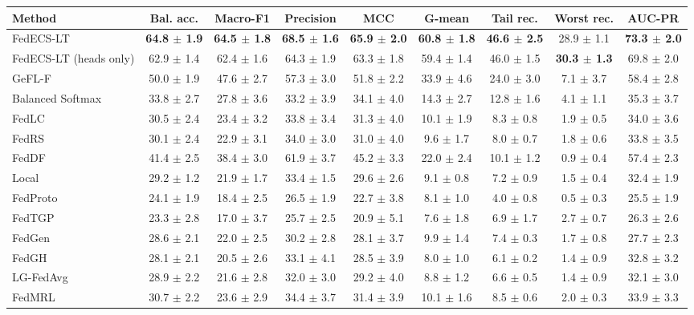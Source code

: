 \begin{tabular}{lcccccccc}
\toprule
Method & Bal. acc. & Macro-F1 & Precision & MCC & G-mean & Tail rec. & Worst rec. & AUC-PR\\
\midrule
FedECS-LT & \textbf{64.8 $\pm$ 1.9} & \textbf{64.5 $\pm$ 1.8} & \textbf{68.5 $\pm$ 1.6} & \textbf{65.9 $\pm$ 2.0} & \textbf{60.8 $\pm$ 1.8} & \textbf{46.6 $\pm$ 2.5} & 28.9 $\pm$ 1.1 & \textbf{73.3 $\pm$ 2.0}\\
FedECS-LT (heads only) & 62.9 $\pm$ 1.4 & 62.4 $\pm$ 1.6 & 64.3 $\pm$ 1.9 & 63.3 $\pm$ 1.8 & 59.4 $\pm$ 1.4 & 46.0 $\pm$ 1.5 & \textbf{30.3 $\pm$ 1.3} & 69.8 $\pm$ 2.0\\
GeFL-F & 50.0 $\pm$ 1.9 & 47.6 $\pm$ 2.7 & 57.3 $\pm$ 3.0 & 51.8 $\pm$ 2.2 & 33.9 $\pm$ 4.6 & 24.0 $\pm$ 3.0 & 7.1 $\pm$ 3.7 & 58.4 $\pm$ 2.8\\
Balanced Softmax & 33.8 $\pm$ 2.7 & 27.8 $\pm$ 3.6 & 33.2 $\pm$ 3.9 & 34.1 $\pm$ 4.0 & 14.3 $\pm$ 2.7 & 12.8 $\pm$ 1.6 & 4.1 $\pm$ 1.1 & 35.3 $\pm$ 3.7\\
FedLC & 30.5 $\pm$ 2.4 & 23.4 $\pm$ 3.2 & 33.8 $\pm$ 3.4 & 31.3 $\pm$ 4.0 & 10.1 $\pm$ 1.9 & 8.3 $\pm$ 0.8 & 1.9 $\pm$ 0.5 & 34.0 $\pm$ 3.6\\
FedRS & 30.1 $\pm$ 2.4 & 22.9 $\pm$ 3.1 & 34.0 $\pm$ 3.0 & 31.0 $\pm$ 4.0 & 9.6 $\pm$ 1.7 & 8.0 $\pm$ 0.7 & 1.8 $\pm$ 0.6 & 33.8 $\pm$ 3.5\\
FedDF & 41.4 $\pm$ 2.5 & 38.4 $\pm$ 3.0 & 61.9 $\pm$ 3.7 & 45.2 $\pm$ 3.3 & 22.0 $\pm$ 2.4 & 10.1 $\pm$ 1.2 & 0.9 $\pm$ 0.4 & 57.4 $\pm$ 2.3\\
Local & 29.2 $\pm$ 1.2 & 21.9 $\pm$ 1.7 & 33.4 $\pm$ 1.5 & 29.6 $\pm$ 2.6 & 9.1 $\pm$ 0.8 & 7.2 $\pm$ 0.9 & 1.5 $\pm$ 0.4 & 32.4 $\pm$ 1.9\\
FedProto & 24.1 $\pm$ 1.9 & 18.4 $\pm$ 2.5 & 26.5 $\pm$ 1.9 & 22.7 $\pm$ 3.8 & 8.1 $\pm$ 1.0 & 4.0 $\pm$ 0.8 & 0.5 $\pm$ 0.3 & 25.5 $\pm$ 1.9\\
FedTGP & 23.3 $\pm$ 2.8 & 17.0 $\pm$ 3.7 & 25.7 $\pm$ 2.5 & 20.9 $\pm$ 5.1 & 7.6 $\pm$ 1.8 & 6.9 $\pm$ 1.7 & 2.7 $\pm$ 0.7 & 26.3 $\pm$ 2.6\\
FedGen & 28.6 $\pm$ 2.1 & 22.0 $\pm$ 2.5 & 30.2 $\pm$ 2.8 & 28.1 $\pm$ 3.7 & 9.9 $\pm$ 1.4 & 7.4 $\pm$ 0.3 & 1.7 $\pm$ 0.8 & 27.7 $\pm$ 2.3\\
FedGH & 28.1 $\pm$ 2.1 & 20.5 $\pm$ 2.6 & 33.1 $\pm$ 4.1 & 28.5 $\pm$ 3.9 & 8.0 $\pm$ 1.0 & 6.1 $\pm$ 0.2 & 1.4 $\pm$ 0.9 & 32.8 $\pm$ 3.2\\
LG-FedAvg & 28.9 $\pm$ 2.2 & 21.6 $\pm$ 2.8 & 32.0 $\pm$ 3.0 & 29.2 $\pm$ 4.0 & 8.8 $\pm$ 1.2 & 6.6 $\pm$ 0.5 & 1.4 $\pm$ 0.9 & 32.1 $\pm$ 3.0\\
FedMRL & 30.7 $\pm$ 2.2 & 23.6 $\pm$ 2.9 & 34.4 $\pm$ 3.7 & 31.4 $\pm$ 3.9 & 10.1 $\pm$ 1.6 & 8.5 $\pm$ 0.6 & 2.0 $\pm$ 0.3 & 33.9 $\pm$ 3.3\\
\bottomrule
\end{tabular}
